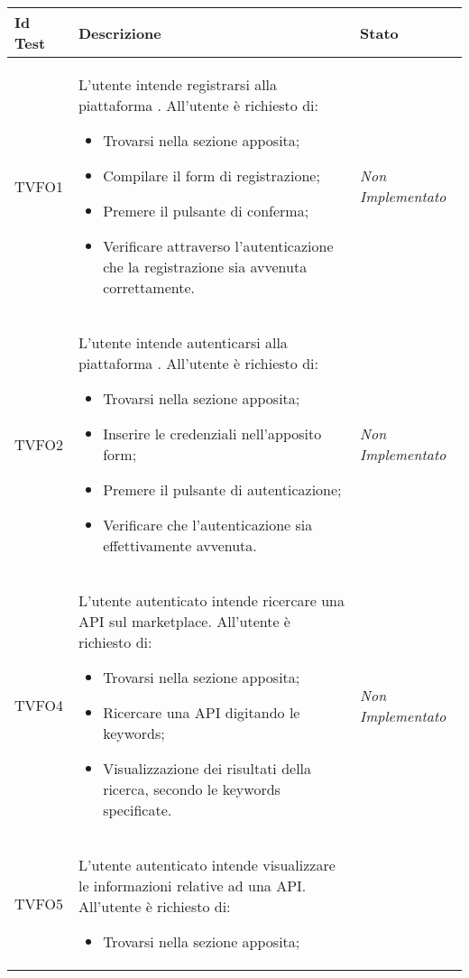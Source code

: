 	\normalsize
	\begin{longtable}{|>{\centering\arraybackslash}p{2.3cm}|>{\centering\arraybackslash}p{7.5cm} | >{\centering\arraybackslash}p{4cm}|}
		\hline \rowcolor{Gray}
		\textbf{Id Test} & \textbf{Descrizione} & \textbf{Stato}\\
		\hline
		\endhead
		\hypertarget{TVFO1}{TVFO1} & L’utente intende registrarsi alla piattaforma \progetto. All’utente è richiesto di:
		\begin{itemize}
			\item Trovarsi nella sezione apposita;
			\item Compilare il form di registrazione;
			\item Premere il pulsante di conferma;
			\item Verificare attraverso l’autenticazione che la registrazione sia avvenuta correttamente.
		\end{itemize}
		& \textit{Non Implementato}\\ \hline
		\hypertarget{TVFO2}{TVFO2} & L’utente intende autenticarsi alla piattaforma \progetto. All’utente è richiesto di:
		\begin{itemize}
			\item Trovarsi nella sezione apposita;
			\item Inserire le credenziali nell’apposito form;
			\item Premere il pulsante di autenticazione;
			\item Verificare che l’autenticazione sia effettivamente avvenuta.
		\end{itemize}
		& \textit{Non Implementato}\\ \hline
		\hypertarget{TVFO4}{TVFO4} & L’utente autenticato  intende ricercare una API sul marketplace. All’utente è richiesto di:
		\begin{itemize}
			\item Trovarsi nella sezione apposita;
			\item Ricercare una API digitando le keywords;
			\item Visualizzazione dei risultati della ricerca, secondo le keywords specificate.
		\end{itemize} & \textit{Non Implementato}\\ \hline
		\hypertarget{TVFO5}{TVFO5} & L’utente autenticato  intende visualizzare le informazioni relative ad una API. All’utente è richiesto di:
		\begin{itemize}
			\item Trovarsi nella sezione apposita;

\end{itemize}
\end{longtable}
